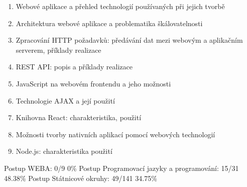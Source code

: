\documentclass{article}
\begin{document}
	\begin{enumerate}[label=\arabic*.]
		\item Webové aplikace a přehled technologií používaných při jejich tvorbě
		\item Architektura webové aplikace a problematika škálovatelnosti
		\item Zpracování HTTP požadavků: předávání dat mezi webovým a aplikačním serverem, příklady realizace
		\item REST API: popis a příklady realizace
		\item JavaScript na webovém frontendu a jeho možnosti
		\item Technologie AJAX a její použití
		\item Knihovna React: charakteristika, použití
		\item Možnosti tvorby nativních aplikací pomocí webových technologií
		\item Node.js: charakteristika použití
	\end{enumerate}
	
	Postup WEBA: 0/9 0\%
	\newline
	\newline
	Postup Programovací jazyky a programování: 15/31 48.38\%
	\newline
	\newline
	Postup Státnicové okruhy: 49/141 34.75\%
	
\end{document}
